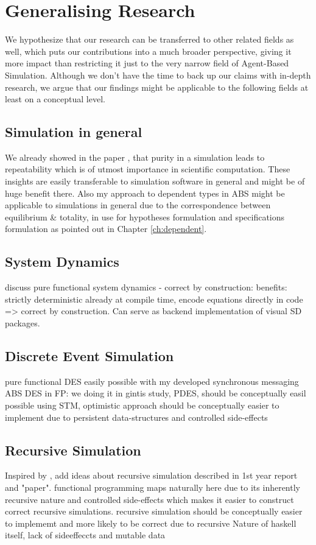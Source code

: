 \section{Generalising Research}
We hypothesize that our research can be transferred to other related fields as well, which puts our contributions into a much broader perspective, giving it more impact than restricting it just to the very narrow field of Agent-Based Simulation. Although we don't have the time to back up our claims with in-depth research, we argue that our findings might be applicable to the following fields at least on a conceptual level.

\subsection{Simulation in general}
We already showed in the paper \cite{thaler_pure_2019}, that purity in a simulation leads to repeatability which is of utmost importance in scientific computation. These insights are easily transferable to simulation software in general and might be of huge benefit there. Also my approach to dependent types in ABS might be applicable to simulations in general due to the correspondence between equilibrium \& totality, in use for hypotheses formulation and specifications formulation as pointed out in Chapter \ref{ch:dependent}. 

\subsection{System Dynamics}
\label{sub:generalising_system_dynamics}
discuss pure functional system dynamics - correct by construction: benefits: strictly deterministic already at compile time, encode equations directly in code => correct by construction. Can serve as backend implementation of visual SD packages.

\subsection{Discrete Event Simulation}
pure functional DES easily possible with my developed synchronous messaging ABS
DES in FP: we doing it in gintis study, 
PDES, should be  conceptually easil possible using STM, optimistic approach should be conceptually easier to implement due to persistent data-structures and controlled side-effects
 
\subsection{Recursive Simulation}
Inspired by \cite{gilmer_recursive_2000}, add ideas about recursive simulation described in 1st year report and "paper". functional programming maps naturally here due to its inherently recursive nature and controlled side-effects which makes it easier to construct correct recursive simulations.
recursive simulation should be conceptually easier to implememt and more likely to be correct due to recursive Nature of haskell itself, lack of sideeffeccts and mutable data

